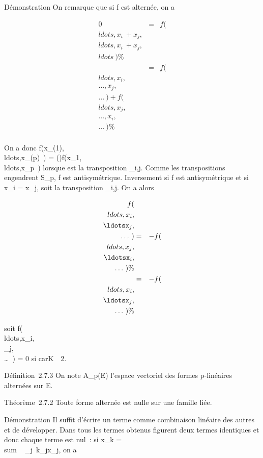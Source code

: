 \documentclass[]{article}
\begin{document}
Démonstration On remarque que si f est alternée, on a

\begin{align*} 0& =&
f(\\ldots,x_i~
+
x_j,\\ldots,x_i~
+
x_j,\\ldots~)
\%& \\ & =&
f(\\ldots,x_i,\\\ldots,x_j,\\\ldots~)
+
f(\\ldots,x_j,\\\ldots,x_i,\\\ldots~)\%&
\\ \end{align*}

On a donc
f(x_\sigma(1),\\ldots,x_\sigma(p)~)
=
\epsilon(\sigma)f(x_1,\\ldots,x_p~)
lorsque \sigma est la transposition \tau_i,j. Comme les transpositions
engendrent S_p, f est antisymétrique. Inversement si f est
antisymétrique et si x_i = x_j, soit \sigma la
transposition \tau_i,j. On a alors

\begin{align*}
f(\\ldots,x_i,\\\ldotsx_j,\\\ldots~)&
=&
-f(\\ldots,x_j,\\\ldotsx_i,\\\ldots~)\%&
\\ & =&
-f(\\ldots,x_i,\\\ldotsx_j,\\\ldots~)\%&
\\ \end{align*}

soit
f(\\ldots,x_i,\\\ldotsx_j,\\\ldots~)
= 0 si carK\mathrel\neq~~2.

Définition~2.7.3 On note A_p(E) l'espace vectoriel des formes
p-linéaires alternées sur E.

Théorème~2.7.2 Toute forme alternée est nulle sur une famille liée.

Démonstration Il suffit d'écrire un terme comme combinaison linéaire des
autres et de développer. Dans tous les termes obtenus figurent deux
termes identiques et donc chaque terme est nul~: si x_k
= \\sum ~
_j\neq~k\alpha_jx_j, on a
\end{document}
